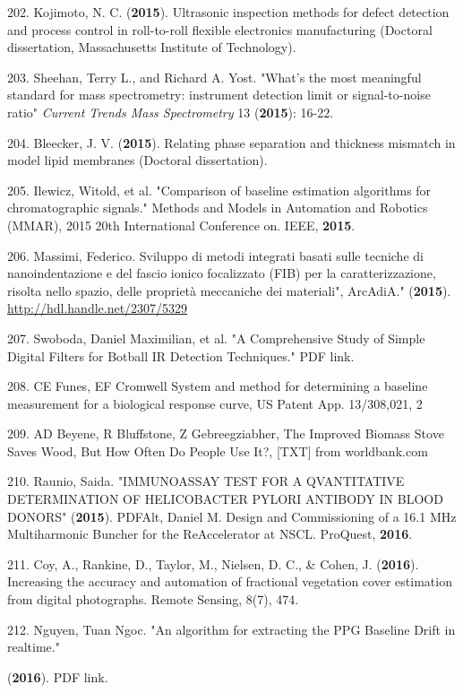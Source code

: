 202. Kojimoto, N. C. (\textbf{2015}). Ultrasonic inspection methods for defect detection and process control in roll-to-roll flexible electronics manufacturing (Doctoral dissertation, Massachusetts Institute of Technology).

203. Sheehan, Terry L., and Richard A. Yost. "What’s the most meaningful standard for mass spectrometry: instrument detection limit or signal-to-noise ratio" \textit{Current Trends Mass Spectrometry} 13 (\textbf{2015}): 16-22.

204. Bleecker, J. V. (\textbf{2015}). Relating phase separation and thickness mismatch in model lipid membranes (Doctoral dissertation).

205. Ilewicz, Witold, et al. "Comparison of baseline estimation algorithms for chromatographic signals." Methods and Models in Automation and Robotics (MMAR), 2015 20th International Conference on. IEEE, \textbf{2015}.

206. Massimi, Federico. Sviluppo di metodi integrati basati sulle tecniche di nanoindentazione e del fascio ionico focalizzato (FIB) per la caratterizzazione, risolta nello spazio, delle propriet\`{a} meccaniche dei materiali", ArcAdiA." (\textbf{2015}). \url{http://hdl.handle.net/2307/5329}

207. Swoboda, Daniel Maximilian, et al. "A Comprehensive Study of Simple Digital Filters for Botball IR Detection Techniques." PDF link.

208. CE Funes, EF Cromwell System and method for determining a baseline measurement for a biological response curve, US Patent App. 13/308,021, 2

209. AD Beyene, R Bluffstone, Z Gebreegziabher, The Improved Biomass Stove Saves Wood, But How Often Do People Use It?, [TXT] from worldbank.com

210. Raunio, Saida. "IMMUNOASSAY TEST FOR A QVANTITATIVE DETERMINATION OF HELICOBACTER PYLORI ANTIBODY IN BLOOD DONORS" (\textbf{2015}). PDFAlt, Daniel M. Design and Commissioning of a 16.1 MHz Multiharmonic Buncher for the ReAccelerator at NSCL. ProQuest, \textbf{2016}.

211. Coy, A., Rankine, D., Taylor, M., Nielsen, D. C., \& Cohen, J. (\textbf{2016}). Increasing the accuracy and automation of fractional vegetation cover estimation from digital photographs. Remote Sensing, 8(7), 474.

212. Nguyen, Tuan Ngoc. "An algorithm for extracting the PPG Baseline Drift in realtime."

(\textbf{2016}). PDF link.

